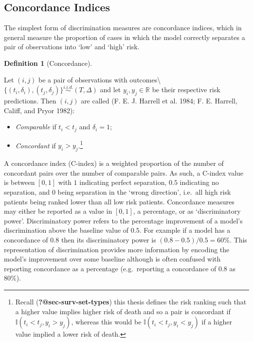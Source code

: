 \documentclass[
  letterpaper,
]{scrbook}
\providecommand{\tightlist}{%
  \setlength{\itemsep}{0pt}\setlength{\parskip}{0pt}}\usepackage{longtable,booktabs,array}
\theoremstyle{plain}
\theoremstyle{definition}
\newtheorem{definition}{Definition}[chapter]
\theoremstyle{remark}
\begin{document}
\hypertarget{sec-eval-crank-disc-conc}{%
\subsection{Concordance Indices}\label{sec-eval-crank-disc-conc}}

The simplest form of discrimination measures are concordance indices,
which in general measure the proportion of cases in which the model
correctly separates a pair of observations into `low' and `high' risk.

\leavevmode{}%
\begin{definition}[Concordance]\label{def-concordance}

Let \((i,j)\) be a pair of observations with outcomes\textbackslash{}
\(\{(t_i,\delta_i),(t_j,\delta_j)\} \stackrel{i.i.d.}\sim(T,\Delta)\)
and let \(y_i,y_j \in \mathbb{R}\) be their respective risk predictions.
Then \((i,j)\) are called (F. E. J. Harrell et al. 1984; F. E. Harrell,
Califf, and Pryor 1982):

\begin{itemize}
\tightlist
\item
  \emph{Comparable} if \(t_i < t_j\) and \(\delta_i = 1\);
\item
  \emph{Concordant} if \(y_i > y_j\).\footnote{Recall
    (\textbf{?@sec-surv-set-types}) this thesis defines the risk ranking
    such that a higher value implies higher risk of death and so a pair
    is concordant if \(\mathbb{I}(t_i < t_j, y_i > y_j)\), whereas this
    would be \(\mathbb{I}(t_i < t_j, y_i < y_j)\) if a higher value
    implied a lower risk of death.}
\end{itemize}

\end{definition}

A concordance index (C-index) is a weighted proportion of the number of
concordant pairs over the number of comparable pairs. As such, a C-index
value is between \([0, 1]\) with \(1\) indicating perfect separation,
\(0.5\) indicating no separation, and \(0\) being separation in the
`wrong direction', i.e.~all high risk patients being ranked lower than
all low risk patients. Concordance measures may either be reported as a
value in \([0,1]\), a percentage, or as `discriminatory power'.
Discriminatory power refers to the percentage improvement of a model's
discrimination above the baseline value of \(0.5\). For example if a
model has a concordance of \(0.8\) then its discriminatory power is
\((0.8-0.5)/0.5 = 60\%\). This representation of discrimination provides
more information by encoding the model's improvement over some baseline
although is often confused with reporting concordance as a percentage
(e.g.~reporting a concordance of 0.8 as 80\%).
\end{document}
